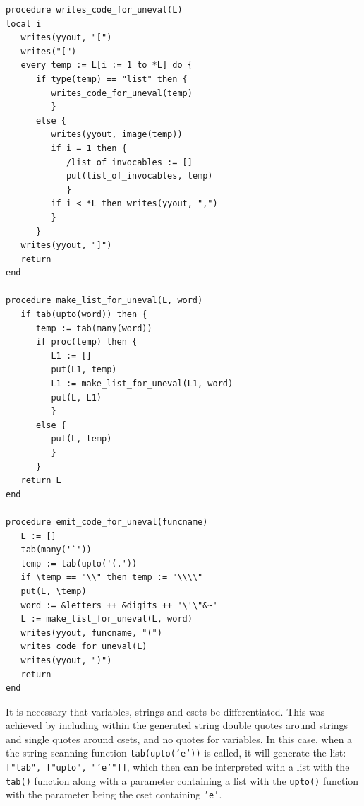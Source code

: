 \documentclass{article}
\begin{document}
\begin{verbatim}
procedure writes_code_for_uneval(L)
local i
   writes(yyout, "[")
   writes("[")
   every temp := L[i := 1 to *L] do {
      if type(temp) == "list" then {
         writes_code_for_uneval(temp)
         } 
      else {
         writes(yyout, image(temp))
         if i = 1 then {
            /list_of_invocables := []
            put(list_of_invocables, temp)
            }
         if i < *L then writes(yyout, ",")
         }
      }
   writes(yyout, "]")
   return
end

procedure make_list_for_uneval(L, word)
   if tab(upto(word)) then {
      temp := tab(many(word))
      if proc(temp) then {
         L1 := []
         put(L1, temp)
         L1 := make_list_for_uneval(L1, word)
         put(L, L1)
         }
      else {
         put(L, temp)
         }
      }
   return L
end

procedure emit_code_for_uneval(funcname)
   L := []
   tab(many('`'))
   temp := tab(upto('(.')) 
   if \temp == "\\" then temp := "\\\\"
   put(L, \temp)
   word := &letters ++ &digits ++ '\'\"&~'
   L := make_list_for_uneval(L, word)
   writes(yyout, funcname, "(")
   writes_code_for_uneval(L)
   writes(yyout, ")")
   return
end
\end{verbatim}
It is necessary that variables, strings and csets be differentiated.  This was achieved by including within the generated string double quotes around strings and single quotes around csets, and no quotes for variables.  In this case, when a the string scanning function \texttt{tab(upto('e'))} is called, it will generate the list: \texttt{["tab", ["upto", "'e'"]]}, which then can be interpreted with a list with the \texttt{tab()} function along with a parameter containing a list with the \texttt{upto()} function with the parameter being the cset containing \texttt{'e'}.
\end{document}
